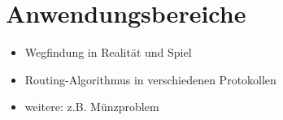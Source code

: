 \section{Anwendungsbereiche}

\begin{frame}
	\begin{itemize}
		\item<2-> Wegfindung in Realität und Spiel
		\item<3-> Routing-Algorithmus in verschiedenen Protokollen
		\item<4-> weitere: z.B. Münzproblem
	\end{itemize}
\end{frame}